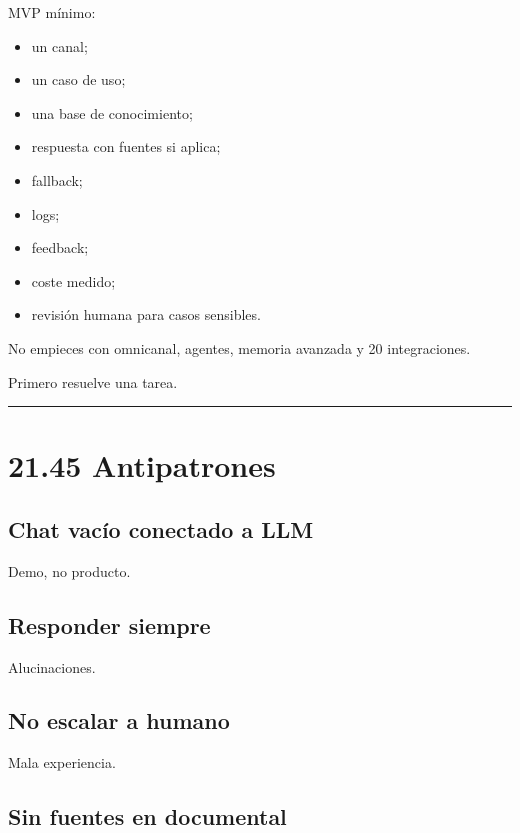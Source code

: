 MVP mínimo:

\begin{itemize}
\tightlist
\item
  un canal;
\item
  un caso de uso;
\item
  una base de conocimiento;
\item
  respuesta con fuentes si aplica;
\item
  fallback;
\item
  logs;
\item
  feedback;
\item
  coste medido;
\item
  revisión humana para casos sensibles.
\end{itemize}

No empieces con omnicanal, agentes, memoria avanzada y 20 integraciones.

Primero resuelve una tarea.

\begin{center}\rule{0.5\linewidth}{0.5pt}\end{center}

\section{21.45 Antipatrones}\label{antipatrones-10}

\subsection{Chat vacío conectado a
LLM}\label{chat-vacuxedo-conectado-a-llm}

Demo, no producto.

\subsection{Responder siempre}\label{responder-siempre}

Alucinaciones.

\subsection{No escalar a humano}\label{no-escalar-a-humano}

Mala experiencia.

\subsection{Sin fuentes en documental}\label{sin-fuentes-en-documental}

